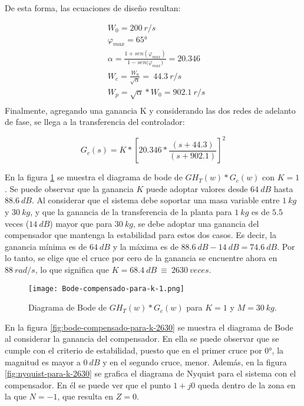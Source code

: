 \noindent De esta forma, las ecuaciones de diseño resultan:

\begin{equation*}
	\begin{aligned}
		&W_0 =200\:r/s\\
		&{\varphi }_{max} =65\textrm{°}\\
		&\alpha =\frac{1+sen({\varphi }_{max})}{1-sen{(\varphi }_{max})}=20.346\\
		&W_c =\frac{W_0}{\sqrt{\alpha }}=\ 44.3\:r/s\\
		&W_p =\sqrt{\alpha }*W_0=902.1\: r/s\\
	\end{aligned}
\end{equation*} 
\noindent Finalmente, agregando una ganancia K y considerando las dos redes de adelanto de fase, se llega a la transferencia del controlador:

\begin{equation}  
	G_c(s)=K*{[20.346*\frac{(s+44.3)}{(s+902.1)}]}^2
	\label{eq:transferencia-del-compensador}
\end{equation} 

En la figura \ref{fig:bode-compensado-para-k-1} se muestra el diagrama de bode de ${GH}_T(w)*G_c(w)$ con $K=1$. Se puede observar que la ganancia $K$ puede adoptar valores desde $64\:dB$ hasta $88.6\:dB$. Al considerar que el sistema debe soportar una masa variable entre $1\:kg$ y $30\:kg$, y que la ganancia de la transferencia de la planta para $1\:kg$ es de $5.5$ veces ($14\:dB$) mayor que para $30\:kg$, se debe adoptar una ganancia del compensador que mantenga la estabilidad para estos dos casos. Es decir, la ganancia m\'{i}nima es de $64\:dB$ y la m\'{a}xima es de $88.6\:dB - 14\:dB = 74.6\:dB$. Por lo tanto, se elige que el cruce por cero de la ganancia se encuentre ahora en $88\:rad/s$, lo que significa que $K=68.4\:dB\ \equiv \ 2630\:veces$.

\begin{figure}[H]
	\centering
	\texttt{[image: Bode-compensado-para-k-1.png]}
	\caption{Diagrama de Bode de $GH_T(w)*G_c(w)$ para $K=1$ y $M=30\:kg$.}
	\label{fig:bode-compensado-para-k-1}
\end{figure}
 
En la figura \ref{fig:bode-compensado-para-k-2630} se muestra el diagrama de Bode al considerar la ganancia del compensador. En ella se puede observar que se  cumple con el criterio de estabilidad, puesto que en el primer cruce por 0°, la magnitud es mayor a $0\:dB$ y en el segundo cruce, menor. Además, en la figura \ref{fig:nyquist-para-k-2630} se grafica el diagrama de Nyquist para el sistema con el compensador. En él se puede ver que el punto $1+j0$ queda dentro de la zona en la que $N=-1$, que resulta en $Z=0$.

